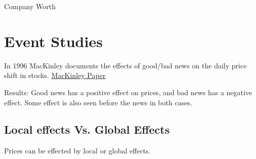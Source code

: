 \documentclass{article}
\begin{document}
\centerline{\Large Company Worth}
\section{Event Studies}
In 1996 MacKinley documents the effects of good/bad news on the daily price shift in stocks.
\href{http://www.bu.edu/econ/files/2011/01/MacKinlay-1996-Event-Studies-in-Economics-and-Finance.pdf}{MacKinley Paper}


Results: Good news has a positive effect on prices, and bad news has a negative effect.  Some effect is also seen before the news in both cases.
\subsection{Local effects Vs. Global Effects}
Prices can be effected by local or global effects.
\end{document}
